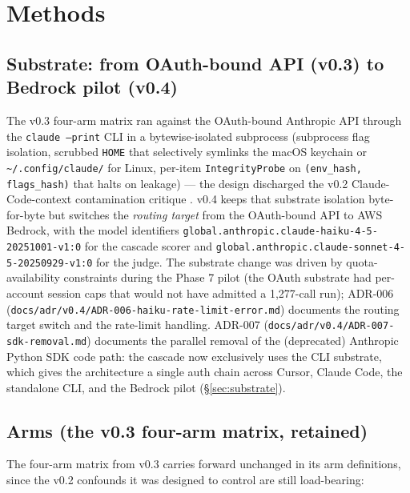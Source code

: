 \section{Methods}\label{sec:methods}

\subsection{Substrate: from OAuth-bound API (v0.3) to Bedrock pilot (v0.4)}

The v0.3 four-arm matrix ran against the OAuth-bound Anthropic API through the \texttt{claude --print} CLI in a bytewise-isolated subprocess (subprocess flag isolation, scrubbed \texttt{HOME} that selectively symlinks the macOS keychain or \texttt{\textasciitilde/.config/claude/} for Linux, per-item \texttt{IntegrityProbe} on \texttt{(env\_hash, flags\_hash)} that halts on leakage) --- the design discharged the v0.2 Claude-Code-context contamination critique \citep{PratyakshaContextEng2025}. v0.4 keeps that substrate isolation byte-for-byte but switches the \emph{routing target} from the OAuth-bound API to AWS Bedrock, with the model identifiers \texttt{global.anthropic.claude-haiku-4-5-20251001-v1:0} for the cascade scorer and \texttt{global.anthropic.claude-sonnet-4-5-20250929-v1:0} for the judge. The substrate change was driven by quota-availability constraints during the Phase 7 pilot (the OAuth substrate had per-account session caps that would not have admitted a 1,277-call run); ADR-006 (\texttt{docs/adr/v0.4/ADR-006-haiku-rate-limit-error.md}) documents the routing target switch and the rate-limit handling. ADR-007 (\texttt{docs/adr/v0.4/ADR-007-sdk-removal.md}) documents the parallel removal of the (deprecated) Anthropic Python SDK code path: the cascade now exclusively uses the CLI substrate, which gives the architecture a single auth chain across Cursor, Claude Code, the standalone CLI, and the Bedrock pilot (\S\ref{sec:substrate}).

\subsection{Arms (the v0.3 four-arm matrix, retained)}

The four-arm matrix from v0.3 carries forward unchanged in its arm definitions, since the v0.2 confounds it was designed to control are still load-bearing:

